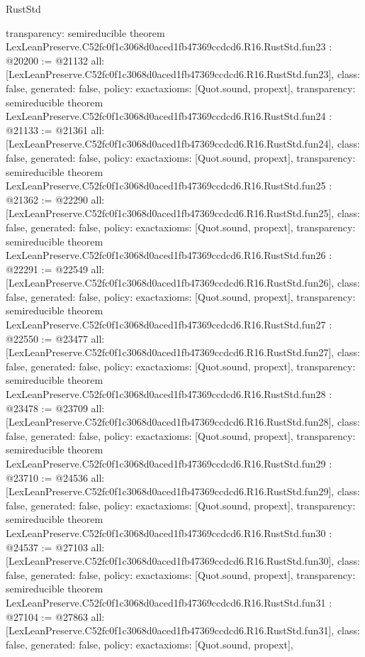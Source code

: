 \begin{lexlean}{RustStd}
\begin{coremodule}
{  transparency: semireducible
}
theorem LexLeanPreserve.C52fc0f1c3068d0aced1fb47369ccdcd6.R16.RustStd.fun23 : @20200 := @21132 {
  all: [LexLeanPreserve.C52fc0f1c3068d0aced1fb47369ccdcd6.R16.RustStd.fun23],
  class: false,
  generated: false,
  policy: exact{axioms: [Quot.sound, propext]},
  transparency: semireducible
}
theorem LexLeanPreserve.C52fc0f1c3068d0aced1fb47369ccdcd6.R16.RustStd.fun24 : @21133 := @21361 {
  all: [LexLeanPreserve.C52fc0f1c3068d0aced1fb47369ccdcd6.R16.RustStd.fun24],
  class: false,
  generated: false,
  policy: exact{axioms: [Quot.sound, propext]},
  transparency: semireducible
}
theorem LexLeanPreserve.C52fc0f1c3068d0aced1fb47369ccdcd6.R16.RustStd.fun25 : @21362 := @22290 {
  all: [LexLeanPreserve.C52fc0f1c3068d0aced1fb47369ccdcd6.R16.RustStd.fun25],
  class: false,
  generated: false,
  policy: exact{axioms: [Quot.sound, propext]},
  transparency: semireducible
}
theorem LexLeanPreserve.C52fc0f1c3068d0aced1fb47369ccdcd6.R16.RustStd.fun26 : @22291 := @22549 {
  all: [LexLeanPreserve.C52fc0f1c3068d0aced1fb47369ccdcd6.R16.RustStd.fun26],
  class: false,
  generated: false,
  policy: exact{axioms: [Quot.sound, propext]},
  transparency: semireducible
}
theorem LexLeanPreserve.C52fc0f1c3068d0aced1fb47369ccdcd6.R16.RustStd.fun27 : @22550 := @23477 {
  all: [LexLeanPreserve.C52fc0f1c3068d0aced1fb47369ccdcd6.R16.RustStd.fun27],
  class: false,
  generated: false,
  policy: exact{axioms: [Quot.sound, propext]},
  transparency: semireducible
}
theorem LexLeanPreserve.C52fc0f1c3068d0aced1fb47369ccdcd6.R16.RustStd.fun28 : @23478 := @23709 {
  all: [LexLeanPreserve.C52fc0f1c3068d0aced1fb47369ccdcd6.R16.RustStd.fun28],
  class: false,
  generated: false,
  policy: exact{axioms: [Quot.sound, propext]},
  transparency: semireducible
}
theorem LexLeanPreserve.C52fc0f1c3068d0aced1fb47369ccdcd6.R16.RustStd.fun29 : @23710 := @24536 {
  all: [LexLeanPreserve.C52fc0f1c3068d0aced1fb47369ccdcd6.R16.RustStd.fun29],
  class: false,
  generated: false,
  policy: exact{axioms: [Quot.sound, propext]},
  transparency: semireducible
}
theorem LexLeanPreserve.C52fc0f1c3068d0aced1fb47369ccdcd6.R16.RustStd.fun30 : @24537 := @27103 {
  all: [LexLeanPreserve.C52fc0f1c3068d0aced1fb47369ccdcd6.R16.RustStd.fun30],
  class: false,
  generated: false,
  policy: exact{axioms: [Quot.sound, propext]},
  transparency: semireducible
}
theorem LexLeanPreserve.C52fc0f1c3068d0aced1fb47369ccdcd6.R16.RustStd.fun31 : @27104 := @27863 {
  all: [LexLeanPreserve.C52fc0f1c3068d0aced1fb47369ccdcd6.R16.RustStd.fun31],
  class: false,
  generated: false,
  policy: exact{axioms: [Quot.sound, propext]},
}
\end{coremodule}
\end{lexlean}
